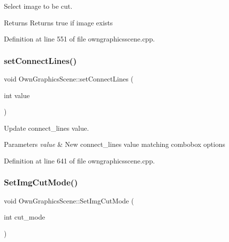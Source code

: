 Select image to be cut. 

\begin{DoxyReturn}{Returns}
Returns true if image exists 
\end{DoxyReturn}


Definition at line 551 of file owngraphicsscene.\+cpp.

\mbox{\label{classOwnGraphicsScene_ad62254e1884fa4817ff1beaa3bc6c011}} 
\subsubsection{\texorpdfstring{set\+Connect\+Lines()}{setConnectLines()}}
{\footnotesize\ttfamily void Own\+Graphics\+Scene\+::set\+Connect\+Lines (\begin{DoxyParamCaption}\item[{int}]{value }\end{DoxyParamCaption})}



Update connect\+\_\+lines value. 


\begin{DoxyParams}{Parameters}
{\em value} & New connect\+\_\+lines value matching combobox options \\
\hline
\end{DoxyParams}


Definition at line 641 of file owngraphicsscene.\+cpp.

\mbox{\label{classOwnGraphicsScene_a656919c9fdd0827ae182d3d3f5f91e4f}} 
\subsubsection{\texorpdfstring{Set\+Img\+Cut\+Mode()}{SetImgCutMode()}}
{\footnotesize\ttfamily void Own\+Graphics\+Scene\+::\+Set\+Img\+Cut\+Mode (\begin{DoxyParamCaption}\item[{int}]{cut\+\_\+mode }\end{DoxyParamCaption})}



